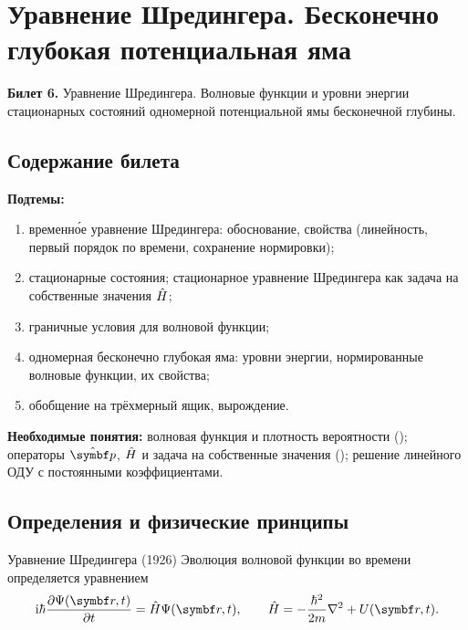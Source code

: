 \chapter[Уравнение Шредингера. Бесконечно глубокая яма]%
        {Уравнение Шредингера. Бесконечно глубокая потенциальная яма}
\label{t:06}

\begin{qbox}
\textbf{Билет 6.} Уравнение Шредингера. Волновые функции и уровни энергии стационарных
состояний одномерной потенциальной ямы бесконечной глубины.
\end{qbox}

\section{Содержание билета}

\textbf{Подтемы:}
\begin{enumerate}
 \item временно́е уравнение Шредингера: обоснование, свойства (линейность, первый порядок по времени, сохранение нормировки);
 \item стационарные состояния; стационарное уравнение Шредингера как задача на собственные значения $\hat{H}$;
 \item граничные условия для волновой функции;
 \item одномерная бесконечно глубокая яма: уровни энергии, нормированные волновые функции, их свойства;
 \item обобщение на трёхмерный ящик, вырождение.
\end{enumerate}

\textbf{Необходимые понятия:} волновая функция и плотность вероятности ();
операторы $\op{\vect p}$, $\hat{H}$ и задача на собственные значения (); решение
линейного ОДУ с постоянными коэффициентами.

\section{Определения и физические принципы}

\begin{principle}{Уравнение Шредингера (1926)}
Эволюция волновой функции во времени определяется уравнением
\begin{equation}\label{eq:6:tdse}
  \ii\hbar\pdiff{\Psi(\vect r,t)}{t}=\op H\Psi(\vect r,t),\qquad
  \op H=-\frac{\hbar^2}{2m}\nabla^2+U(\vect r,t).
\end{equation}
\end{principle}

